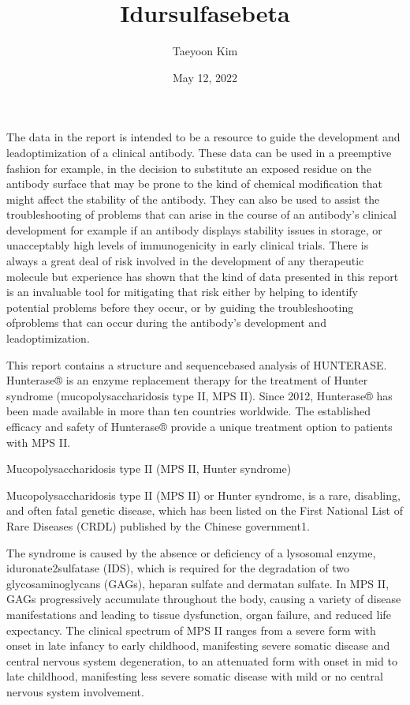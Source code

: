 \documentclass[letterpaper,10pt,english]{jupyterBook}
\title{Idursulfasebeta}
\date{May 12, 2022}
\author{Taeyoon Kim}
\begin{document}
\pagestyle{empty}
\sphinxmaketitle
\pagestyle{plain}
\sphinxtableofcontents
\pagestyle{normal}
\label{\detokenize{intro::doc}}


\sphinxAtStartPar
The data in the report is intended to be a resource to guide the development and lead\sphinxhyphen{}optimization of a clinical antibody. These data can be used in a preemptive fashion \sphinxhyphen{} for example, in the decision to substitute an exposed residue on the antibody surface that may be prone to the kind of chemical modification that might affect the stability of the antibody. They can also be used to assist the troubleshooting of problems that can arise in the course of an antibody’s clinical development \sphinxhyphen{} for example if an antibody displays stability issues in storage, or unacceptably high levels of immunogenicity in early clinical trials. There is always a great deal of risk involved in the development of any therapeutic molecule but experience has shown that the kind of data presented in this report is an invaluable tool for mitigating that risk \sphinxhyphen{} either by helping to identify potential problems before they occur, or by guiding the troubleshooting ofproblems that can occur during the antibody’s development and lead\sphinxhyphen{}optimization.

\begin{DUlineblock}{0em}
\item[] 
\end{DUlineblock}

\sphinxAtStartPar
This report contains a structure and sequence\sphinxhyphen{}based analysis of HUNTERASE. Hunterase® is an enzyme replacement therapy for the treatment of Hunter syndrome (mucopolysaccharidosis type II, MPS II). Since 2012, Hunterase® has been made available in more than ten countries worldwide. The established efficacy and safety of Hunterase® provide a unique treatment option to patients with MPS II.

\sphinxAtStartPar
Mucopolysaccharidosis type II (MPS II, Hunter syndrome)

\sphinxAtStartPar
Mucopolysaccharidosis type II (MPS II) or Hunter syndrome, is a rare, disabling, and often fatal genetic disease, which has been listed on the First National List of Rare Diseases (CRDL) published by the Chinese government1.

\sphinxAtStartPar
The syndrome is caused by the absence or deficiency of a lysosomal enzyme, iduronate\sphinxhyphen{}2\sphinxhyphen{}sulfatase (IDS), which is required for the degradation of two glycosaminoglycans (GAGs), heparan sulfate and dermatan sulfate. In MPS II, GAGs progressively accumulate throughout the body, causing a variety of disease manifestations and leading to tissue dysfunction, organ failure, and reduced life expectancy. The clinical spectrum of MPS II ranges from a severe form with onset in late infancy to early childhood, manifesting severe somatic disease and central nervous system degeneration, to an attenuated form with onset in mid to late childhood, manifesting less severe somatic disease with mild or no central nervous system involvement.
\end{document}
